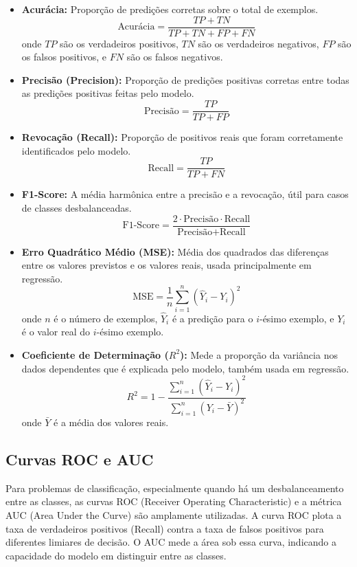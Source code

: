 \documentclass{article}
\begin{document}
\begin{itemize}
    \item \textbf{Acurácia:} Proporção de predições corretas sobre o total de exemplos.
    \[
    \text{Acurácia} = \frac{TP + TN}{TP + TN + FP + FN}
    \]
    onde $TP$ são os verdadeiros positivos, $TN$ são os verdadeiros negativos, $FP$ são os falsos positivos, e $FN$ são os falsos negativos.

    \item \textbf{Precisão (Precision):} Proporção de predições positivas corretas entre todas as predições positivas feitas pelo modelo.
    \[
    \text{Precisão} = \frac{TP}{TP + FP}
    \]

    \item \textbf{Revocação (Recall):} Proporção de positivos reais que foram corretamente identificados pelo modelo.
    \[
    \text{Recall} = \frac{TP}{TP + FN}
    \]

    \item \textbf{F1-Score:} A média harmônica entre a precisão e a revocação, útil para casos de classes desbalanceadas.
    \[
    \text{F1-Score} = \frac{2 \cdot \text{Precisão} \cdot \text{Recall}}{\text{Precisão} + \text{Recall}}
    \]

    \item \textbf{Erro Quadrático Médio (MSE):} Média dos quadrados das diferenças entre os valores previstos e os valores reais, usada principalmente em regressão.
    \[
    \text{MSE} = \frac{1}{n} \sum_{i=1}^{n} (\hat{Y}_i - Y_i)^2
    \]
    onde $n$ é o número de exemplos, $\hat{Y}_i$ é a predição para o $i$-ésimo exemplo, e $Y_i$ é o valor real do $i$-ésimo exemplo.

    \item \textbf{Coeficiente de Determinação (\(R^2\)):} Mede a proporção da variância nos dados dependentes que é explicada pelo modelo, também usada em regressão.
    \[
    R^2 = 1 - \frac{\sum_{i=1}^{n} (\hat{Y}_i - Y_i)^2}{\sum_{i=1}^{n} (Y_i - \bar{Y})^2}
    \]
    onde $\bar{Y}$ é a média dos valores reais.
\end{itemize}

\subsection{Curvas ROC e AUC}

Para problemas de classificação, especialmente quando há um desbalanceamento entre as classes, as curvas ROC (Receiver Operating Characteristic) e a métrica AUC (Area Under the Curve) são amplamente utilizadas. A curva ROC plota a taxa de verdadeiros positivos (Recall) contra a taxa de falsos positivos para diferentes limiares de decisão. O AUC mede a área sob essa curva, indicando a capacidade do modelo em distinguir entre as classes.
\end{document}
